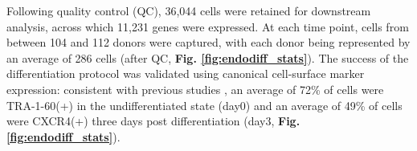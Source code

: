 Following quality control (QC), 36,044 cells were retained for downstream analysis, across which 11,231 genes were expressed.
At each time point, cells from between 104 and 112 donors were captured, with each donor being represented by an average of 286 cells (after QC, \textbf{Fig. \ref{fig:endodiff_stats}}). 
The success of the differentiation protocol was validated using canonical cell-surface marker expression: consistent with previous studies \cite{chu2016single}, an average of 72\% of cells were TRA-1-60(+) in the undifferentiated state (day0) and an average of 49\% of cells were CXCR4(+) three days post differentiation (day3, \textbf{Fig. \ref{fig:endodiff_stats}}).
 
